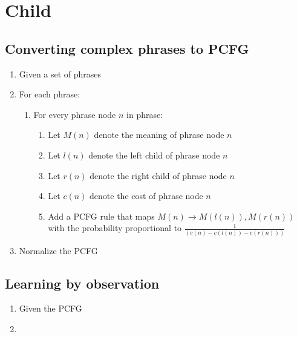 \documentclass[a4paper]{article}
\begin{document}
\section{Child}
\subsection{Converting complex phrases to PCFG}
\begin{enumerate}
  \item Given a set of phrases
  \item For each phrase:
    \begin{enumerate}
      \item For every phrase node $n$ in phrase:
        \begin{enumerate}
          \item Let $M(n)$ denote the meaning of phrase node $n$
          \item Let $l(n)$ denote the left child of phrase node $n$
          \item Let $r(n)$ denote the right child of phrase node $n$
          \item Let $c(n)$ denote the cost of phrase node $n$
          \item Add a PCFG rule that maps $M(n) \rightarrow M(l(n)),M(r(n))$ with the probability proportional to $\frac{1}{(c(n)-c(l(n))-c(r(n)))}$
        \end{enumerate}
    \end{enumerate}
  \item Normalize the PCFG
\end{enumerate}
\subsection{Learning by observation}
\begin{enumerate}
  \item Given the PCFG
  \item 
\end{enumerate}

\end{document}

